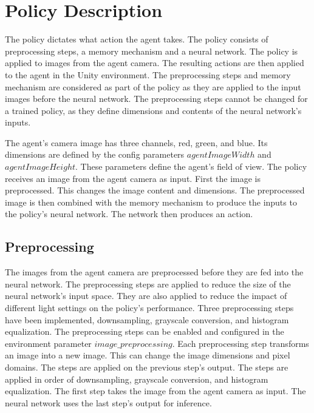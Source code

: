 
\section{Policy Description}

\label{fig:policy_description}

The policy dictates what action the agent takes. The policy consists of preprocessing steps, a memory mechanism and a neural network. The policy is applied to images from the agent camera. The resulting actions are then applied to the agent in the Unity environment.
The preprocessing steps and memory mechanism are considered as part of the policy as they are applied to the input images before the neural network. The preprocessing steps cannot be changed for a trained policy, as they define dimensions and contents of the neural network's inputs.

The agent's camera image has three channels, red, green, and blue. Its dimensions are defined by the config parameters $agentImageWidth$ and $agentImageHeight$. These parameters define the agent's field of view.
The policy receives an image from the agent camera as input. First the image is preprocessed. This changes the image content and dimensions. The preprocessed image is then combined with the memory mechanism to produce the inputs to the policy's neural network. The network then produces an action.


\subsection{Preprocessing}

The images from the agent camera are preprocessed before they are fed into the neural network. The preprocessing steps are applied to reduce the size of the neural network's input space. They are also applied to reduce the impact of different light settings on the policy's performance.
Three preprocessing steps have been implemented, downsampling, grayscale conversion, and histogram equalization. The preprocessing steps can be enabled and configured in the environment parameter $image\_preprocessing$. Each preprocessing step transforms an image into a new image. This can change the image dimensions and pixel domains. The steps are applied on the previous step's output. The steps are applied in order of downsampling, grayscale conversion, and histogram equalization. The first step takes the image from the agent camera as input.
The neural network uses the last step's output for inference.

